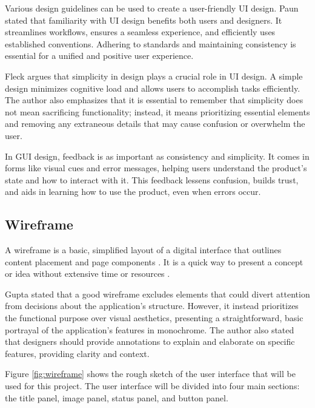 Various design guidelines can be used to create a user-friendly UI design. Paun \cite{Paun_2020} stated that familiarity with UI design benefits both users and designers. It streamlines workflows, ensures a seamless experience, and efficiently uses established conventions. Adhering to standards and maintaining consistency is essential for a unified and positive user experience.

Fleck \cite{Fleck_2021} argues that simplicity in design plays a crucial role in UI design. A simple design minimizes cognitive load and allows users to accomplish tasks efficiently. The author also emphasizes that it is essential to remember that simplicity does not mean sacrificing functionality; instead, it means prioritizing essential elements and removing any extraneous details that may cause confusion or overwhelm the user.

In GUI design, feedback is as important as consistency and simplicity. It comes in forms like visual cues and error messages, helping users understand the product's state and how to interact with it. This feedback lessens confusion, builds trust, and aids in learning how to use the product, even when errors occur. \cite{Florido_2022}

\subsection{Wireframe}
\label{subsec:wireframe}

A wireframe is a basic, simplified layout of a digital interface that outlines content placement and page components \cite{White_2023}. It is a quick way to present a concept or idea without extensive time or resources \cite{White_2023}.

Gupta \cite{Gupta_2023} stated that a good wireframe excludes elements that could divert attention from decisions about the application's structure. However, it instead prioritizes the functional purpose over visual aesthetics, presenting a straightforward, basic portrayal of the application's features in monochrome. The author also stated that designers should provide annotations to explain and elaborate on specific features, providing clarity and context.

Figure \ref{fig:wireframe} shows the rough sketch of the user interface that will be used for this project. The user interface will be divided into four main sections: the title panel, image panel, status panel, and button panel.



